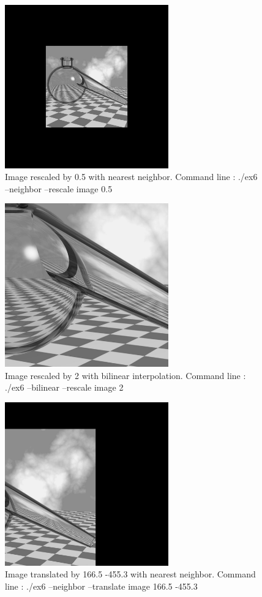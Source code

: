 \documentclass[10pt]{article}
\begin{document}
\begin{figure}[!ht]
	\centering
	\includegraphics[height=200pt]{./ex6/rescale05.jpg}
	\caption{Image rescaled by 0.5 with nearest neighbor. Command line : ./ex6 --neighbor --rescale image 0.5}
\end{figure}
\begin{figure}[!ht]
	\centering
	\includegraphics[height=200pt]{./ex6/rescale2.jpg}
	\caption{Image rescaled by 2 with bilinear interpolation. Command line : ./ex6 --bilinear --rescale image 2}
\end{figure}
\begin{figure}[!ht]
	\centering
	\includegraphics[height=200pt]{./ex6/translate1.jpg}
	\caption{Image translated by 166.5 -455.3 with nearest neighbor. Command line : ./ex6 --neighbor --translate image 166.5 -455.3}
\end{figure}
\end{document}

